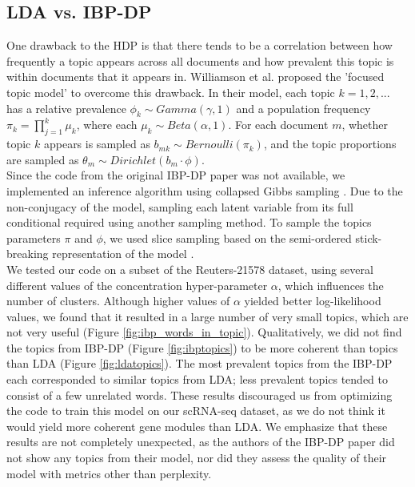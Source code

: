 \documentclass{article}
\begin{document}
\subsection{LDA vs. IBP-DP}
One drawback to the HDP is that there tends to be a correlation between how frequently a topic appears across all documents and how prevalent this topic is within documents that it appears in. Williamson et al. \cite{IBP} proposed the 'focused topic model' to overcome this drawback. In their model, each topic $k = 1,2,...$ has a relative prevalence $\phi_k \sim Gamma(\gamma, 1)$ and a population frequency $\pi_k = \prod^k_{j=1} \mu_k$, where each $\mu_k \sim Beta(\alpha, 1) $. For each document $m$, whether topic $k$ appears is sampled as $b_{mk} \sim Bernoulli(\pi_k)$, and the topic proportions are sampled as $\theta_m \sim Dirichlet(b_m \cdot \phi)$. \\

Since the code from the original IBP-DP paper was not available, we implemented an inference algorithm using collapsed Gibbs sampling \cite{IBP}. Due to the non-conjugacy of the model, sampling each latent variable from its full conditional required using another sampling method. To sample the topics parameters $\pi$ and $\phi$, we used slice sampling based on the semi-ordered stick-breaking representation of the model \cite{IBP2}.\\

We tested our code on a subset of the Reuters-21578 dataset, using several different values of the concentration hyper-parameter $\alpha$, which influences the number of clusters. Although higher values of $\alpha$ yielded better log-likelihood values, we found that it resulted in a large number of very small topics, which are not very useful (Figure \ref{fig:ibp_words_in_topic}). Qualitatively, we did not find the topics from IBP-DP (Figure \ref{fig:ibptopics}) to be more coherent than topics than LDA (Figure \ref{fig:ldatopics}). The most prevalent topics from the IBP-DP each corresponded to similar topics from LDA; less prevalent topics tended to consist of a few unrelated words. These results discouraged us from optimizing the code to train this model on our scRNA-seq dataset, as we do not think it would yield more coherent gene modules than LDA. We emphasize that these results are not completely unexpected, as the authors of the IBP-DP paper did not show any topics from their model, nor did they assess the quality of their model with metrics other than perplexity.
\end{document}
